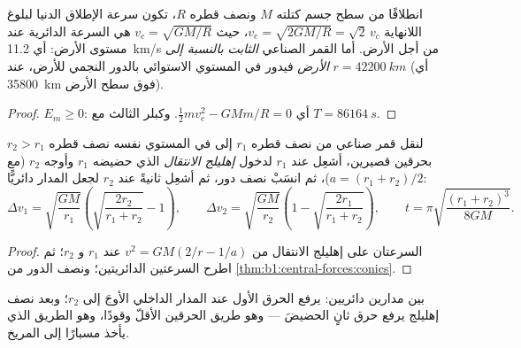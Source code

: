 \begin{proposition}\label{prop:b1:central-forces:escape}
انطلاقًا من سطح جسم كتلته $M$ ونصف قطره $R$، تكون سرعة
الإطلاق الدنيا لبلوغ اللانهاية $v_e = \sqrt{2GM/R} = \sqrt2\,v_c$،
حيث $v_c = \sqrt{GM/R}$ هي السرعة الدائرية عند مستوى الأرض:
أي \qty{11.2}{km/s} من أجل الأرض. أما القمر الصناعي \emph{الثابت بالنسبة إلى الأرض}
فيدور في المستوي الاستوائي بالدور النجمي للأرض، عند
$r = \qty{42200}{km}$ (أي \qty{35800}{km} فوق سطح الأرض).
\end{proposition}

\begin{proof}
$E_m \geq 0$: أي $\tfrac12 mv_e^2 - GMm/R = 0$. وكبلر الثالث مع $T = \qty{86164}{s}$.
\end{proof}

\begin{proposition}\label{prop:b1:central-forces:hohmann}
لنقل قمر صناعي من  نصف قطره $r_1$ إلى 
في المستوي نفسه نصف قطره $r_2 > r_1$ بحرقين قصيرين، أشعِل عند $r_1$
لدخول \emph{إهليلج الانتقال} الذي حضيضه $r_1$ وأوجه $r_2$
(مع $a = (r_1 + r_2)/2$)، ثم انسَبْ نصف دور، ثم أشعِل ثانيةً عند $r_2$
لجعل المدار دائريًّا:
\[
\Delta v_1 = \sqrt{\frac{GM}{r_1}}\left(\sqrt{\frac{2r_2}{r_1 + r_2}} - 1\right),
\qquad
\Delta v_2 = \sqrt{\frac{GM}{r_2}}\left(1 - \sqrt{\frac{2r_1}{r_1 + r_2}}\right),
\qquad
t = \pi\sqrt{\frac{(r_1 + r_2)^3}{8GM}} .
\]
\end{proposition}

\begin{proof}
السرعتان على إهليلج الانتقال من $v^2 = GM(2/r - 1/a)$ عند $r_1$ و
$r_2$؛ ثم اطرح السرعتين الدائريتين؛ ونصف الدور من
\cref{thm:b1:central-forces:conics}.
\end{proof}

\begin{omfigure}

{\small {} بين مدارين دائريين: يرفع الحرق الأول عند
المدار الداخلي الأوجَ إلى $r_2$؛ وبعد نصف إهليلج يرفع
حرق ثانٍ الحضيضَ --- وهو طريق الحرقين الأقلّ وقودًا، وهو
الطريق الذي يأخذ مسبارًا إلى المريخ.}
\end{omfigure}

